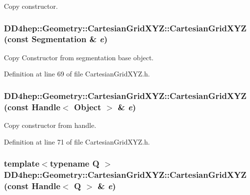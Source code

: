 Copy constructor. \hypertarget{class_d_d4hep_1_1_geometry_1_1_cartesian_grid_x_y_z_ad82c02f00f16d9849f2cef9f622ac691}{
\subsubsection[{CartesianGridXYZ}]{\setlength{\rightskip}{0pt plus 5cm}DD4hep::Geometry::CartesianGridXYZ::CartesianGridXYZ (const {\bf Segmentation} \& {\em e})}}
\label{class_d_d4hep_1_1_geometry_1_1_cartesian_grid_x_y_z_ad82c02f00f16d9849f2cef9f622ac691}


Copy Constructor from segmentation base object. 

Definition at line 69 of file CartesianGridXYZ.h.\hypertarget{class_d_d4hep_1_1_geometry_1_1_cartesian_grid_x_y_z_a81acd66a472e7cea44351a2120ef789a}{
\subsubsection[{CartesianGridXYZ}]{\setlength{\rightskip}{0pt plus 5cm}DD4hep::Geometry::CartesianGridXYZ::CartesianGridXYZ (const {\bf Handle}$<$ {\bf Object} $>$ \& {\em e})}}
\label{class_d_d4hep_1_1_geometry_1_1_cartesian_grid_x_y_z_a81acd66a472e7cea44351a2120ef789a}


Copy constructor from handle. 

Definition at line 71 of file CartesianGridXYZ.h.\hypertarget{class_d_d4hep_1_1_geometry_1_1_cartesian_grid_x_y_z_a99cfd639255681ac6773d137bb738ff4}{
\subsubsection[{CartesianGridXYZ}]{\setlength{\rightskip}{0pt plus 5cm}template$<$typename Q $>$ DD4hep::Geometry::CartesianGridXYZ::CartesianGridXYZ (const {\bf Handle}$<$ Q $>$ \& {\em e})}}
\label{class_d_d4hep_1_1_geometry_1_1_cartesian_grid_x_y_z_a99cfd639255681ac6773d137bb738ff4}


